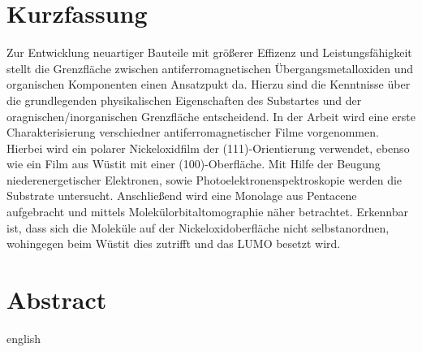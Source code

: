 \thispagestyle{plain}

\section*{Kurzfassung}
Zur Entwicklung neuartiger Bauteile mit größerer Effizenz und Leistungsfähigkeit stellt die Grenzfläche zwischen antiferromagnetischen Übergangsmetalloxiden und organischen Komponenten einen Ansatzpukt da.
Hierzu sind die Kenntnisse über die grundlegenden physikalischen Eigenschaften des Substartes und der oragnischen/inorganischen Grenzfläche entscheidend.
In der Arbeit wird eine erste Charakterisierung verschiedner antiferromagnetischer Filme vorgenommen.
Hierbei wird ein polarer Nickeloxidfilm der (111)-Orientierung verwendet, ebenso wie ein Film aus Wüstit mit einer (100)-Oberfläche.
Mit Hilfe der Beugung niederenergetischer Elektronen, sowie Photoelektronenspektroskopie werden die Substrate untersucht.
Anschließend wird eine Monolage aus Pentacene aufgebracht und mittels Molekülorbitaltomographie näher betrachtet.
Erkennbar ist, dass sich die Moleküle auf der Nickeloxidoberfläche nicht selbstanordnen, wohingegen beim Wüstit dies zutrifft und das LUMO besetzt wird.

\section*{Abstract}
\begin{foreignlanguage}{english}

\end{foreignlanguage}
